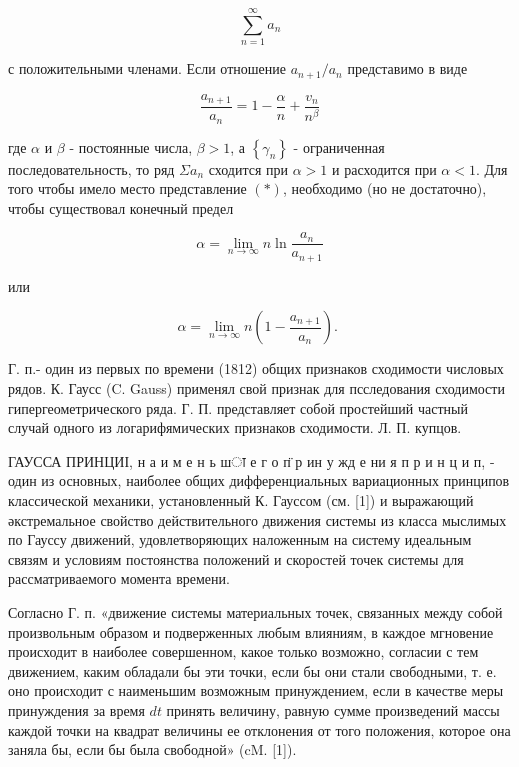\documentclass[10pt]{article}
\begin{document}
\[

\sum_{n=1}^{\infty} a_{n}

\]



с положительными членами. Если отношение $a_{n+1} / a_{n}$ представимо в виде



\[

\frac{a_{n+1}}{a_{n}}=1-\frac{\alpha}{n}+\frac{v_{n}}{n^{\beta}}

\]



где $\alpha$ и $\beta$ - постоянные числа, $\beta>1$, а $\left\{\gamma_{n}\right\}$ - ограниченная последовательность, то ряд $\Sigma a_{n}$ сходится при $\alpha>1$ и расходится при $\alpha<1$. Для того чтобы имело место представление $(*)$, необходимо (но не достаточно), чтобы существовал конечный предел



\[

\alpha=\lim _{n \rightarrow \infty} n \ln \frac{a_{n}}{a_{n+1}}

\]



или



\[

\alpha=\lim _{n \rightarrow \infty} n\left(1-\frac{a_{n+1}}{a_{n}}\right) \text {. }

\]



Г. п.- один из первых по времени (1812) общих признаков сходимости числовых рядов. К. Гаусс (C. Gauss) применял свой признак для псследования сходимости гипергеометрического ряда. Г. П. представляет собой простейший частный случай одного из логарифямических признаков сходимости. Л. П. купцов.



ГАУССА ПРИНЦИІ, н а и м е н ь шा е г о п̈ р ин у жд е ни я п р и н ц и п, - один из основных, наиболее общих дифференциальных вариационных принципов классической механики, установленный К. Гауссом (см. [1]) и выражающий әкстремальное свойство действительного движения системы из класса мыслимых по Гауссу движений, удовлетворяющих наложенным на систему идеальным связям и условиям постоянства положений и скоростей точек системы для рассматриваемого момента времени.



Согласно Г. п. «движение системы материальных точек, связанных между собой произвольным образом и подверженных любым влияниям, в каждое мгновение происходит в наиболее совершенном, какое только возможно, согласии с тем движением, каким обладали бы эти точки, если бы они стали свободными, т. е. оно происходит с наименьшим возможным принуждением, если в качестве меры принуждения за время $d t$ принять величину, равную сумме произведений массы каждой точки на квадрат величины ее отклонения от того положения, которое она заняла бы, если бы была свободной» (cM. [1]).
\end{document}
